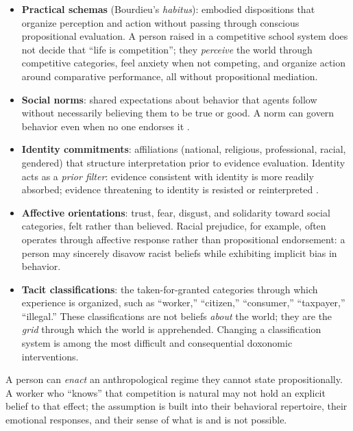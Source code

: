 \begin{itemize}[nosep]
  \item \textbf{Practical schemas} (Bourdieu's \textit{habitus}): embodied dispositions that organize perception and action without passing through conscious propositional evaluation.
  A person raised in a competitive school system does not decide that ``life is competition''; they \emph{perceive} the world through competitive categories, feel anxiety when not competing, and organize action around comparative performance, all without propositional mediation.

  \item \textbf{Social norms}: shared expectations about behavior that agents follow without necessarily believing them to be true or good.
  A norm can govern behavior even when no one endorses it \autocite{cialdini2006}.

  \item \textbf{Identity commitments}: affiliations (national, religious, professional, racial, gendered) that structure interpretation prior to evidence evaluation.
  Identity acts as a \emph{prior filter}: evidence consistent with identity is more readily absorbed; evidence threatening to identity is resisted or reinterpreted \autocite{kahan2012}.

  \item \textbf{Affective orientations}: trust, fear, disgust, and solidarity toward social categories, felt rather than believed.
  Racial prejudice, for example, often operates through affective response rather than propositional endorsement: a person may sincerely disavow racist beliefs while exhibiting implicit bias in behavior.

  \item \textbf{Tacit classifications}: the taken-for-granted categories through which experience is organized, such as ``worker,'' ``citizen,'' ``consumer,'' ``taxpayer,'' ``illegal.''
  These classifications are not beliefs \emph{about} the world; they are the \emph{grid} through which the world is apprehended.
  Changing a classification system is among the most difficult and consequential doxonomic interventions.
\end{itemize}

A person can \emph{enact} an anthropological regime they cannot state propositionally.
A worker who ``knows'' that competition is natural may not hold an explicit belief to that effect; the assumption is built into their behavioral repertoire, their emotional responses, and their sense of what is and is not possible.

